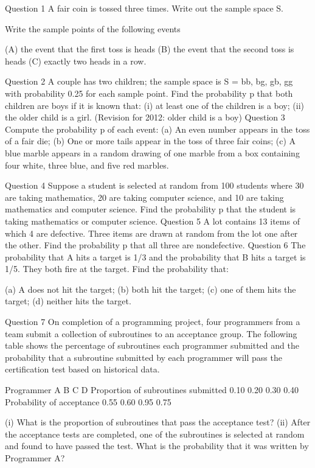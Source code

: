 Question 1
A fair coin is tossed three times. Write out the sample space S.

Write the sample points of the following events

(A) the event that the first toss is heads
(B) the event that the second toss is heads
(C) exactly two heads in a row.

Question 2
A couple has two children; the sample space is S = {bb, bg, gb, gg} with probability 0.25 for each sample point. Find the probability p that both children are boys if it is known that: 
(i) at least one of the children is a boy;
(ii) the older child is a girl. 		(Revision for 2012: older child is a boy)
Question 3
Compute the probability p of each event:
(a) An even number appears in the toss of a fair die;
(b) One or more tails appear in the toss of three fair coins;
(c) A blue marble appears in a random drawing of one marble from a box containing four white, three blue, and five red marbles.

Question 4
Suppose a student is selected at random from 100 students where 30 are taking mathematics, 20 are taking computer science, and 10 are taking mathematics and computer science. Find the probability p that the student is taking mathematics or computer science.
Question 5
A lot contains 13 items of which 4 are defective. Three items are drawn at random from the lot one after the other. Find the probability p that all three are nondefective.
Question 6
The probability that A hits a target is 1/3 and the probability that B hits a target is 1/5.  They both fire at the target. Find the probability that:

(a) A does not hit the target; 
(b) both hit the target; 
(c) one of them hits the target; 
(d) neither hits the target.

Question 7
On completion of a programming project, four programmers from a team submit a collection of subroutines to an acceptance group. The following table shows the percentage of subroutines each programmer submitted and the probability that a subroutine submitted by each programmer will pass the certification test based on historical data.

Programmer	A	B	C	D
Proportion of subroutines submitted	0.10	0.20	0.30	0.40
Probability of acceptance	0.55	0.60	0.95	0.75

(i) What is the proportion of subroutines that pass the acceptance test?
(ii) After the acceptance tests are completed, one of the subroutines is selected at random and found to have passed the test. What is the probability that it was written by Programmer A?


